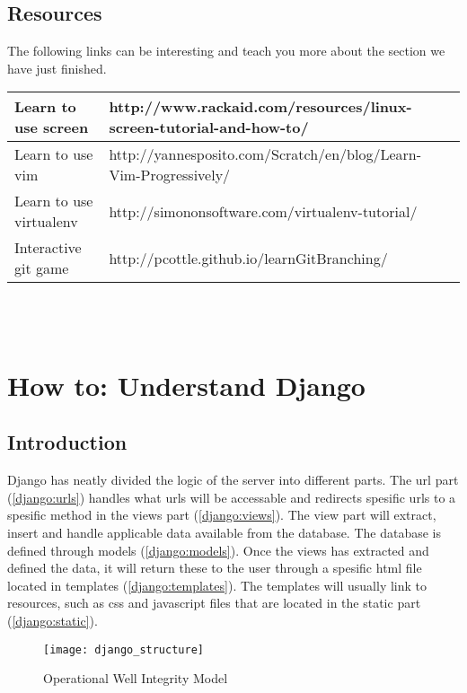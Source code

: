 \documentclass{report}
\begin{document}
\subsection{Resources}
The following links can be interesting and teach you more about the section we have just finished. \\

\begin{tabular}{| l | p{9cm} |} \hline
Learn to use screen & http://www.rackaid.com/resources/linux-screen-tutorial-and-how-to/ \\ \hline
Learn to use vim & http://yannesposito.com/Scratch/en/blog/Learn-Vim-Progressively/ \\ \hline
Learn to use virtualenv & http://simononsoftware.com/virtualenv-tutorial/ \\ \hline
Interactive git game & http://pcottle.github.io/learnGitBranching/ \\ \hline
\end{tabular}\\ \\

\section{How to: Understand Django} \label{sec:understand_django}
\subsection{Introduction}
Django has neatly divided the logic of the server into different parts. The url part (\ref{django:urls}) handles what urls will be accessable and redirects spesific urls to a spesific method in the views part (\ref{django:views}). The view part will extract, insert and handle applicable data available from the database. The database is defined through models (\ref{django:models}). Once the views has extracted and defined the data, it will return these to the user through a spesific html file located in templates (\ref{django:templates}). The templates will usually link to resources, such as css and javascript files that are located in the static part (\ref{django:static}). 

\begin{center}
\begin{figure}
    \centering
    \texttt{[image: django\_structure]}
    \caption{Operational Well Integrity Model \label{fig:django_struct}}
\end{figure}
\end{center}
\end{document}

